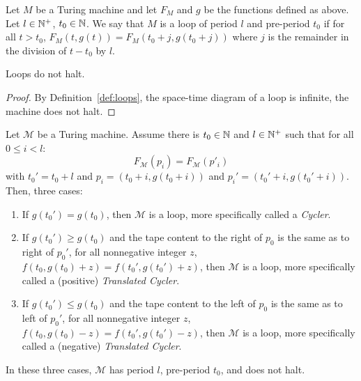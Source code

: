 \begin{definition}[Loops]\label{def:loops}
    Let $M$ be a Turing machine and let $F_M$ and $g$ be the functions defined as above. Let $l \in \mathbb{N}^+$, $t_0 \in \mathbb{N}$.
    We say that $M$ is a loop of period $l$ and pre-period $t_0$ if for all $t > t_0$, $F_M(t,g(t)) = F_M(t_0 + j,g(t_0 + j))$ where $j$ is the remainder in the division of $t - t_0$ by $l$.
\end{definition}

\begin{lemma}\label{lem:loopdonthalt}
    Loops do not halt.
\end{lemma}
\begin{proof} By Definition~\ref{def:loops}, the space-time diagram of a loop is infinite, the machine does not halt.
\end{proof}

\begin{theorem}[Loops]\label{th:loops:theory} Let $\mathcal{M}$ be a Turing machine.
    Assume there is $ t_0 \in \mathbb{N}$ and $l \in \mathbb{N}^+$ such that
    for all $0 \leq i < l$: $$F_\mathcal{M}(p_i)   = F_\mathcal{M}(p'_i)$$
    with $t_0' = t_0+l$ and $p_i = (t_0+i, g(t_0+i))$ and $p_i' = (t_0'+i, g(t_0'+i))$. Then, three cases:
    \begin{enumerate}
        \item If $g(t_0') = g(t_0)$, then $\mathcal{M}$ is a loop, more specifically called a \textit{Cycler}.\label{th:case1}
        \item If $g(t_0') \geq g(t_0)$ and the tape content to the right of $p_0$ is the same as to right of $p_0'$, \ie for all nonnegative integer $z$, $f(t_0,g(t_0)+z) = f(t_0',g(t_0')+z)$, then $\mathcal{M}$ is a loop, more specifically called a (positive) \textit{Translated Cycler}.\label{th:case2}
        \item If $g(t_0') \leq g(t_0)$ and the tape content to the left of $p_0$ is the same as to left of $p_0'$, \ie for all nonnegative integer $z$, $f(t_0,g(t_0)-z) = f(t_0',g(t_0')-z)$, then $\mathcal{M}$ is a loop, more specifically called a (negative) \textit{Translated Cycler}.\label{th:case3}
    \end{enumerate}
    In these three cases, $\mathcal{M}$ has period $l$, pre-period $t_0$, and does not halt.
\end{theorem}


